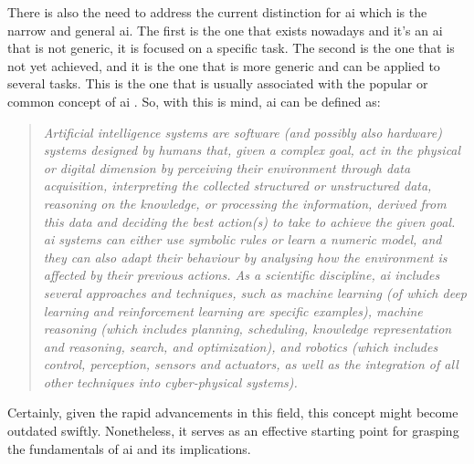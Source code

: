 There is also the need to address the current distinction for \ac{ai} which is the narrow and general \ac{ai}. The first is the one that exists nowadays and it's an \ac{ai} that is not generic, it is focused on a specific task. The second is the one that is not yet achieved, and it is the one that is more generic and can be applied to several tasks. This is the one that is usually associated with the popular or common concept of \ac{ai} \cite{DefinitionAIMain2019,DBLP:books/aw/RN2020}. So, with this is mind, \ac{ai} can be defined as:
\begin{quote}
    \textit{Artificial intelligence systems are software (and possibly also hardware) systems designed by humans that, given a complex goal, act in the physical or digital dimension by perceiving their environment through data acquisition, interpreting the collected structured or unstructured data, reasoning on the knowledge, or processing the information, derived from this data and deciding the best action(s) to take to achieve the given goal. \ac{ai} systems can either use symbolic rules or learn a numeric model, and they can also adapt their behaviour by analysing how the environment is affected by their previous actions. As a scientific discipline, \ac{ai} includes several approaches and techniques, such as machine learning (of which deep learning and reinforcement learning are specific examples), machine reasoning (which includes planning, scheduling, knowledge representation and reasoning, search, and optimization), and robotics (which includes control, perception, sensors and actuators, as well as the integration of all other techniques into cyber-physical systems).} \cite{DefinitionAIMain2019}
    \end{quote}
    
Certainly, given the rapid advancements in this field, this concept might become outdated swiftly. Nonetheless, it serves as an effective starting point for grasping the fundamentals of \ac{ai} and its implications.



